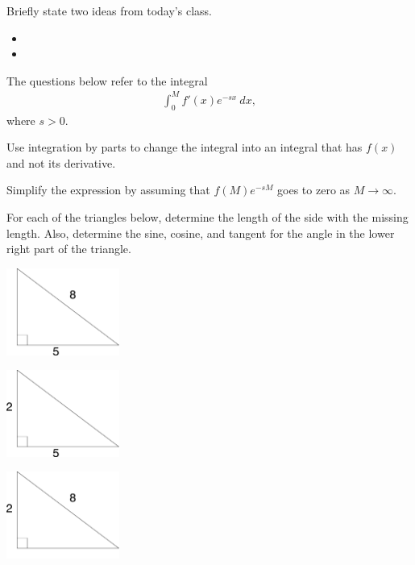 \postClass

\begin{problem}
\item Briefly state two ideas from today's class.
  \begin{itemize}
  \item
  \item
  \end{itemize}
\item The questions below refer to the integral
\begin{eqnarray*}
  \int^M_0 f'(x) e^{-sx} ~ dx,
\end{eqnarray*}
where $s>0$.
  \begin{subproblem}
    \item Use integration by parts to change the integral into an integral
    that has $f(x)$ and not its derivative.
     \vfill
     \item Simplify the expression by assuming that $f(M)e^{-sM}$ goes to zero as $M\rightarrow\infty$.
     \
  \end{subproblem}
\end{problem}


\preClass{Integraton}

\begin{problem}
\item For each of the triangles below, determine the length of the
  side with the missing length. Also, determine the sine, cosine, and tangent
  for the angle in the lower right part of the triangle.
  \begin{subproblem}
  \item \includegraphics[width=10em]{ink/trigSubs/triangleValuesBottomHyp}
    \vfill
  \item \includegraphics[width=10em]{ink/trigSubs/triangleValuesLeftBottom}
    \vfill
  \item \includegraphics[width=10em]{ink/trigSubs/triangleValuesLeftHyp}
    \vfill
  \end{subproblem}
\end{problem}



